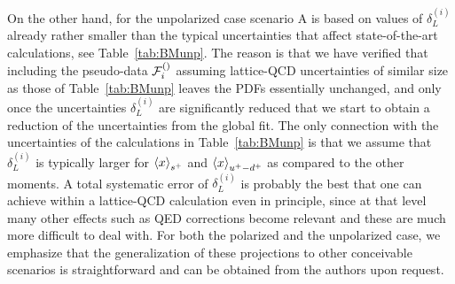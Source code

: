     On the other hand, for the unpolarized case scenario A is based on values
    of $\delta_L^{(i)}$ already rather smaller than the typical
    uncertainties that affect state-of-the-art calculations, see Table~\ref{tab:BMunp}.
    The reason is that we have verified that including the pseudo-data $\mathcal{F}_i^{(\rm)}$
    assuming lattice-QCD uncertainties of similar size as those of Table~\ref{tab:BMunp}
    leaves the PDFs essentially unchanged, and only once the uncertainties
    $\delta_L^{(i)}$ are significantly reduced that we start to obtain a reduction
    of the uncertainties from the global fit.
    The only connection with the uncertainties of the calculations in Table~\ref{tab:BMunp}
    is that we assume that $\delta_L^{(i)}$ is typically larger for $\left\langle x\right\rangle_{s^+}$
    and $\left\langle x\right\rangle_{u^+-d^+}$ as compared to the other moments.
    A total systematic error of $\delta_L^{(i)}$ is probably the best that one can achieve
    within a lattice-QCD calculation even in principle, since at that level many other
    effects such as QED corrections become relevant and these are much more difficult
    to deal with.
    For both
    the polarized and
    the unpolarized case,
    we emphasize that the generalization of these projections to other conceivable scenarios
    is straightforward and can be obtained from the authors upon request.
 
